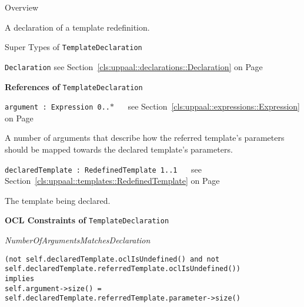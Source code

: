 	\begin{longdescription}
		\item[Overview] 		
				

	

		A declaration of a template redefinition.		
		\item[Super Types of \texttt{TemplateDeclaration}] ~
			\begin{longdescription}
				\item[\texttt{Declaration}] see Section~\ref{cls:uppaal::declarations::Declaration} on Page~\pageref{cls:uppaal::declarations::Declaration}						\end{longdescription}
		
	
			\item[\textbf{References of} \texttt{TemplateDeclaration}] ~
			\begin{longdescription}
	\item[\texttt{argument : Expression 	\symbol{"5B}0..$*$\symbol{"5D}
}] ~
	see Section~\ref{cls:uppaal::expressions::Expression} on Page~\pageref{cls:uppaal::expressions::Expression}
	
	\nopagebreak
		
				

	

		A number of arguments that describe how the referred template's parameters should be mapped towards the declared template's parameters.		
	\item[\texttt{declaredTemplate : RedefinedTemplate 	\symbol{"5B}1..1\symbol{"5D}
}] ~
	see Section~\ref{cls:uppaal::templates::RedefinedTemplate} on Page~\pageref{cls:uppaal::templates::RedefinedTemplate}
	
	\nopagebreak
		
				

	

		The template being declared.		
			\end{longdescription}
			\item[\textbf{OCL Constraints of} \texttt{TemplateDeclaration}] ~
			\begin{longdescription}
	\item[\small\textit{NumberOfArgumentsMatchesDeclaration}] ~ 
	\nopagebreak
	
		\begin{lstlisting}[breaklines=true]
(not self.declaredTemplate.oclIsUndefined() and not self.declaredTemplate.referredTemplate.oclIsUndefined())
implies
self.argument->size() = self.declaredTemplate.referredTemplate.parameter->size()		\end{lstlisting}
			\end{longdescription}
	
	\end{longdescription}
	
